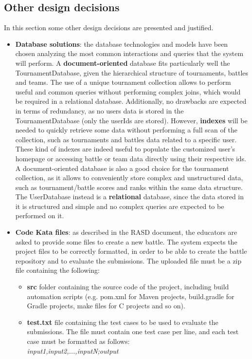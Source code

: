\subsection{Other design decisions}
In this section some other design decisions are presented and justified.
\begin{itemize}
    \item \textbf{Database solutions}: the database technologies and models have been chosen analyzing the most common interactions and queries that the system will perform. 
    A \textbf{document-oriented} database fits particularly well the TournamentDatabase, given the hierarchical structure of tournaments, battles and teams. The use of a unique tournament collection allows to perform useful and common queries without performing complex joins, which would be required in a relational database.
    Additionally, no drawbacks are expected in terms of redundancy, as no users data is stored in the TournamentDatabase (only the userIds are stored).
    However, \textbf{indexes} will be needed to quickly retrieve some data without performing a full scan of the collection, such as tournaments and battles data related to a specific user. These kind of indexes are indeed useful to populate the customized user's homepage or accessing battle or team data directly using their respective ids.
    A document-oriented database is also a good choice for the tournament collection, as it allows to conveniently store complex and unstructured data, such as tournament/battle scores and ranks within the same data structure.
    The UserDatabase instead is a \textbf{relational} database, since the data stored in it is structured and simple and no complex queries are expected to be performed on it.
    \item \textbf{Code Kata files}: as described in the RASD document, the educators are asked to provide some files to create a new battle. The system expects the project files to be correctly formatted, in order to be able to create the battle repository and to evaluate the submissions.
    The uploaded file must be a zip file containing the following:
    \begin{itemize}
        \item \textbf{src} folder containing the source code of the project, including build automation scripts (e.g. pom.xml for Maven projects, build.gradle for Gradle projects, make files for C projects and so on). 
        \item \textbf{test.txt} file containing the test cases to be used to evaluate the submissions. The file must contain one test case per line, and each test case must be formatted as follows:\\
         \textit{input1,input2,...,inputN;output}
    \end{itemize}
\end{itemize}